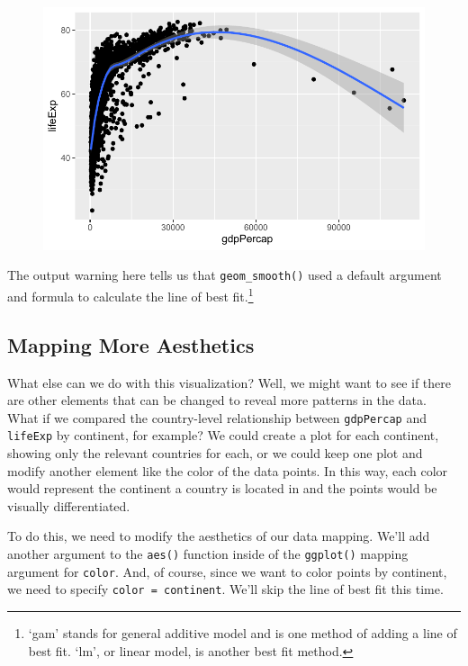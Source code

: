 \documentclass[
  letterpaper,
]{book}
\begin{document}
\begin{figure}[H]

{\centering \includegraphics{visualizing-with-ggplot_files/figure-pdf/unnamed-chunk-17-1.pdf}

}

\end{figure}

The output warning here tells us that \texttt{geom\_smooth()} used a
default argument and formula to calculate the line of best
fit.\footnote{`gam' stands for general additive model and is one method
  of adding a line of best fit. `lm', or linear model, is another best
  fit method.}

\hypertarget{mapping-more-aesthetics}{%
\subsection{Mapping More Aesthetics}\label{mapping-more-aesthetics}}

What else can we do with this visualization? Well, we might want to see
if there are other elements that can be changed to reveal more patterns
in the data. What if we compared the country-level relationship between
\texttt{gdpPercap} and \texttt{lifeExp} by continent, for example? We
could create a plot for each continent, showing only the relevant
countries for each, or we could keep one plot and modify another element
like the color of the data points. In this way, each color would
represent the continent a country is located in and the points would be
visually differentiated.

To do this, we need to modify the aesthetics of our data mapping. We'll
add another argument to the \texttt{aes()} function inside of the
\texttt{ggplot()} mapping argument for \texttt{color}. And, of course,
since we want to color points by continent, we need to specify
\texttt{color\ =\ continent}. We'll skip the line of best fit this time.
\end{document}
